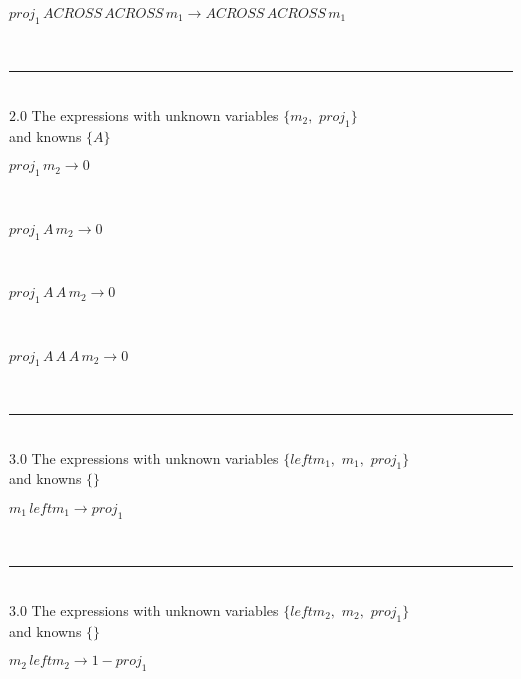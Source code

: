 \documentclass[rep10,leqno]{report}
\begin{document}
\begin{minipage}{6in}
$
proj_{1}\,
 ACROSS\,
 ACROSS\,
 m_{1}\rightarrow ACROSS\,
 ACROSS\,
 m_{1}
$
\end{minipage}\\
\rule[3pt]{6in}{.7pt}\\
$2.0$  The expressions with unknown variables $\{m_{2},
$ $
proj_{1}\}$\\
and knowns $\{A\}$\smallskip\\
\begin{minipage}{6in}
$
proj_{1}\,
 m_{2}\rightarrow 0
$
\end{minipage}\medskip \\
\begin{minipage}{6in}
$
proj_{1}\,
 A\,
 m_{2}\rightarrow 0
$
\end{minipage}\medskip \\
\begin{minipage}{6in}
$
proj_{1}\,
 A\,
 A\,
 m_{2}\rightarrow 0
$
\end{minipage}\medskip \\
\begin{minipage}{6in}
$
proj_{1}\,
 A\,
 A\,
 A\,
 m_{2}\rightarrow 0
$
\end{minipage}\\
\rule[3pt]{6in}{.7pt}\\
$3.0$  The expressions with unknown variables $\{leftm_{1},
$ $
m_{1},
$ $
proj_{1}\}$\\
and knowns $\{\}$\smallskip\\
\begin{minipage}{6in}
$
m_{1}\,
 leftm_{1}\rightarrow proj_{1}
$
\end{minipage}\\
\rule[3pt]{6in}{.7pt}\\
$3.0$  The expressions with unknown variables $\{leftm_{2},
$ $
m_{2},
$ $
proj_{1}\}$\\
and knowns $\{\}$\smallskip\\
\begin{minipage}{6in}
$
m_{2}\,
 leftm_{2}\rightarrow 1 - proj_{1}
$
\end{minipage}\\
\vspace{10pt}
\end{document}
